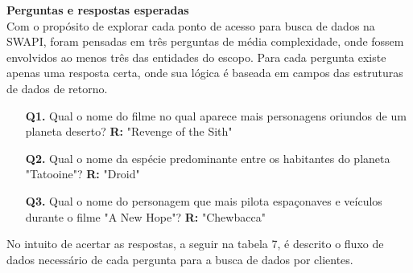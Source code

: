 \textbf{Perguntas e respostas esperadas} \\

Com o propósito de explorar cada ponto de acesso para busca de dados na SWAPI, foram pensadas em três perguntas de média complexidade, onde fossem envolvidos ao menos três das entidades do escopo. Para cada pergunta existe apenas uma resposta certa, onde sua lógica é baseada em campos das estruturas de dados de retorno.

\begin{enumerate}
\item[\textbf{Q1.}] Qual o nome do filme no qual aparece mais personagens oriundos de um planeta deserto? \textbf{R:} "Revenge of the Sith"
\item[\textbf{Q2.}] Qual o nome da espécie predominante entre os habitantes do planeta "Tatooine"? \textbf{R:} "Droid"
\item[\textbf{Q3.}] Qual o nome do personagem que mais pilota espaçonaves e veículos durante o filme "A New Hope"? \textbf{R:} "Chewbacca"
\end{enumerate}

No intuito de acertar as respostas, a seguir na tabela 7, é descrito o fluxo de dados necessário de cada pergunta para a busca de dados por clientes.

